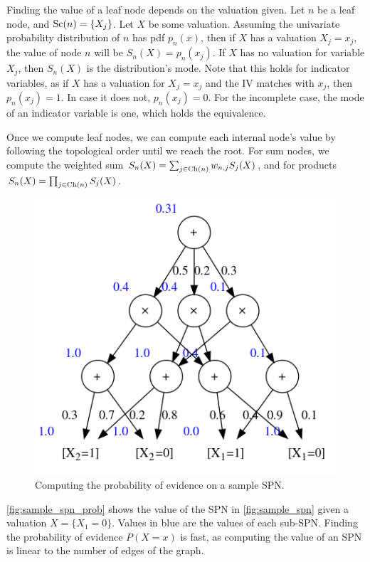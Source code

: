 Finding the value of a leaf node depends on the valuation given. Let $n$ be a leaf node, and
$\operatorname*{\text{Sc}}(n)=\{X_j\}$. Let $X$ be some valuation. Assuming the univariate probability distribution of
$n$ has pdf $p_n(x)$, then if $X$ has a valuation $X_j=x_j$, the value of node $n$ will be
$S_n(X)=p_n(x_j)$. If $X$ has no valuation for variable $X_j$, then $S_n(X)$ is the
distribution's mode. Note that this holds for indicator variables, as if $X$ has a valuation for
$X_j=x_j$ and the IV matches with $x_j$, then $p_n(x_j)=1$. In case it does not, $p_n(x_j)=0$. For
the incomplete case, the mode of an indicator variable is one, which holds the equivalence.

Once we compute leaf nodes, we can compute each internal node's value by following the topological
order until we reach the root. For sum nodes, we compute the weighted sum
$S_n(X)=\sum_{j\in\operatorname*{\text{Ch}}(n)}w_{n,j}S_j(X)$, and for products $S_n(X)=\prod_{j\in\operatorname*{\text{Ch}}(n)}S_j(X)$.

\begin{figure}[h]
  \centering\includegraphics[scale=0.6]{graphs/sample_spn_prob.png}
  \caption{Computing the probability of evidence on a sample SPN.\label{fig:sample_spn_prob}}
\end{figure}

\autoref{fig:sample_spn_prob} shows the value of the SPN in \autoref{fig:sample_spn} given a
valuation $X=\{X_1=0\}$. Values in blue are the values of each sub-SPN\@. Finding the probability
of evidence $P(X=x)$ is fast, as computing the value of an SPN is linear to the number of edges of
the graph.

